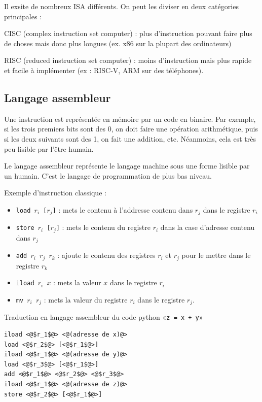 \begin{rem}
	Il exsite de nombreux ISA différents. On peut les diviser en deux catégories principales :
	
	CISC (complex instruction set computer) : plus d'instruction pouvant faire plus de choses mais donc plus longues (ex. x86 sur la plupart des ordinateurs)
	
	RISC (reduced instruction set computer) : moins d'instruction mais plus rapide et facile à implémenter (ex : RISC-V, ARM sur des téléphones).
\end{rem}

\subsection{Langage assembleur}

Une instruction est représentée en mémoire par un code en binaire. Par exemple, si les trois premiers bits sont des 0, on doit faire une opération arithmétique, puis si les deux suivants sont des 1, on fait une addition, etc. Néanmoins, cela est très peu lisible par l'être humain.

\begin{definition}
	Le langage assembleur représente le langage machine sous une forme lisible par un humain. C'est le langage de programmation de plus bas niveau.
\end{definition}

\begin{example}
	Exemple d'instruction classique : \begin{itemize}[label=$\bullet$]
		\item \texttt{load $r_i$ [$r_j$]}  : mets le contenu à l'addresse contenu dans $r_j$ dans le registre $r_i$
		\item \texttt{store $r_i$ [$r_j$]} : mets le contenu du registre $r_i$ dans la case d'adresse contenu dans $r_j$
		\item \texttt{add $r_i$ $r_j$ $r_k$} : ajoute le contenu des registres $r_i$ et $r_j$ pour le mettre dans le registre $r_k$
		\item \texttt{iload $r_i$ $x$} : mets la valeur $x$ dans le registre $r_i$
		\item \texttt{mv $r_i$ $r_j$} : mets la valeur du registre $r_i$ dans le registre $r_j$.
	\end{itemize}
\end{example}

\begin{example}
	Traduction en langage assembleur du code python «\texttt{z = x + y}»
	\begin{lstlisting}
iload <@$r_1$@> <@(adresse de x)@>
load <@$r_2$@> [<@$r_1$@>]
iload <@$r_1$@> <@(adresse de y)@>
load <@$r_3$@> [<@$r_1$@>]
add <@$r_1$@> <@$r_2$@> <@$r_3$@>
iload <@$r_1$@> <@(adresse de z)@>
store <@$r_2$@> [<@$r_1$@>]
	\end{lstlisting}
\end{example}

